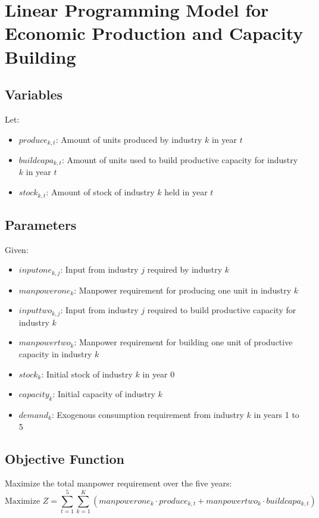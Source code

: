\documentclass{article}
\begin{document}
\section*{Linear Programming Model for Economic Production and Capacity Building}

\subsection*{Variables}
Let:
\begin{itemize}
    \item \( produce_{k, t} \): Amount of units produced by industry \( k \) in year \( t \)
    \item \( buildcapa_{k, t} \): Amount of units used to build productive capacity for industry \( k \) in year \( t \)
    \item \( stock_{k, t} \): Amount of stock of industry \( k \) held in year \( t \)
\end{itemize}

\subsection*{Parameters}
Given:
\begin{itemize}
    \item \( inputone_{k, j} \): Input from industry \( j \) required by industry \( k \)
    \item \( manpowerone_{k} \): Manpower requirement for producing one unit in industry \( k \)
    \item \( inputtwo_{k, j} \): Input from industry \( j \) required to build productive capacity for industry \( k \)
    \item \( manpowertwo_{k} \): Manpower requirement for building one unit of productive capacity in industry \( k \)
    \item \( stock_{k} \): Initial stock of industry \( k \) in year 0
    \item \( capacity_{k} \): Initial capacity of industry \( k \)
    \item \( demand_{k} \): Exogenous consumption requirement from industry \( k \) in years 1 to 5
\end{itemize}

\subsection*{Objective Function}
Maximize the total manpower requirement over the five years:
\[
\text{Maximize } Z = \sum_{t=1}^{5} \sum_{k=1}^{K} (manpowerone_{k} \cdot produce_{k, t} + manpowertwo_{k} \cdot buildcapa_{k,t})
\]
\end{document}
